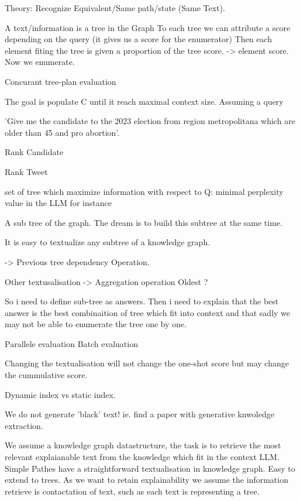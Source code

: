 \documentclass[10pt]{article}
\theoremstyle{definition}
\begin{document}
Theory: Recognize Equivalent/Same path/state (Same Text). 

A text/information is a tree in the Graph
To each tree we can attribute a score depending on the query (it gives us a score for the enumerator)
Then each element fiting the tree is given a proportion of the tree score. 
    -> element score. 
Now we enumerate. 

Concurant tree-plan evaluation 



The goal is populate C until it reach maximal context size. 
Assuming a query 

'Give me the candidate to the 2023 election from region metropolitana which are older than 45 and pro abortion'.

Rank Candidate

Rank Tweet 

set of tree which maximize information with respect to Q: 
    minimal perplexity value in the LLM for instance 

A sub tree of the graph.
The dream is to build this subtree at the same time. 

It is easy to textualize any subtree of a knowledge graph.

-> Previous tree dependency Operation.

Other textusalisation -> Aggregation operation
Oldest ? 



So i need to define sub-tree as answers. 
Then i need to explain that the best answer is the best combinaition of tree which fit into context and that sadly we may not be able to enumerate the tree one by one.


Parallele evaluation 
Batch evaluation 



Changing the textualisation will not change the one-shot score but may change the cummulative score. 


Dynamic index vs static index. 


We do not generate 'black' text! 
ie. find a paper with generative knwoledge extraction.




We assume a knowledge graph datastructure, the task is to retrieve the most relevant explaianable text from the knowledge which fit in the context LLM. 
Simple Pathes have a straightforward textualisation in knowledge graph.
Easy to extend to trees. 
As we want to retain explainability we assume the information retrieve is contactation of text, such as each text is representing a tree.
\end{document}
